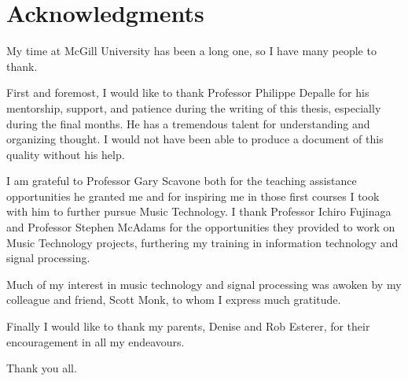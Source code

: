 \section*{Acknowledgments}
My time at McGill University has been a long one, so I have many people to
thank.

First and foremost, I would like to thank Professor Philippe Depalle for his
mentorship, support, and patience during the writing of this thesis, especially
during the final months. He has a tremendous talent for understanding and
organizing thought. I would not have been able to produce a document of this
quality without his help.

I am grateful to Professor Gary Scavone both for the teaching assistance
opportunities he granted me and for inspiring me in those first courses I took
with him to further pursue Music Technology. I thank Professor Ichiro Fujinaga
and Professor Stephen McAdams for the opportunities they provided to work on
Music Technology projects, furthering my training in information technology and
signal processing.

Much of my interest in music technology and signal processing was awoken by
my colleague and friend, Scott Monk, to whom I express much gratitude.

Finally I would like to thank my parents, Denise and Rob Esterer, for their
encouragement in all my endeavours.

Thank you all.
